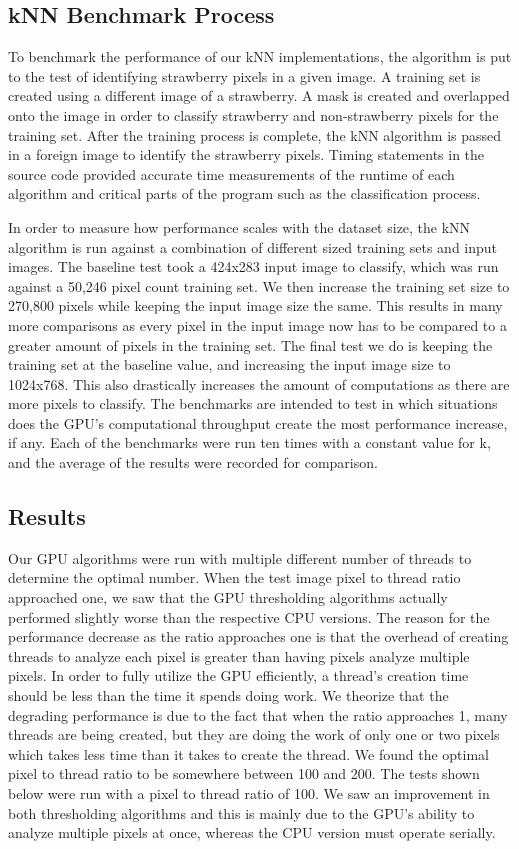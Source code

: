 \documentclass[conference]{IEEEtran}
\begin{document}
\subsection{kNN Benchmark Process}
To benchmark the performance of our kNN implementations, the algorithm is put to the test of identifying strawberry pixels in a given image. A training set is created using a different image of a strawberry. A mask is created and overlapped onto the image in order to classify strawberry and non-strawberry pixels for the training set. After the training process is complete, the kNN algorithm is passed in a foreign image to identify the strawberry pixels. Timing statements in the source code provided accurate time measurements of the runtime of each algorithm and critical parts of the program such as the classification process.

In order to measure how performance scales with the dataset size, the kNN algorithm is run against a combination of different sized training sets and input images. The baseline test took a 424x283 input image to classify, which was run against a 50,246 pixel count training set. We then increase the training set size to 270,800 pixels while keeping the input image size the same. This results in many more comparisons as every pixel in the input image now has to be compared to a greater amount of pixels in the training set. The final test we do is keeping the training set at the baseline value, and increasing the input image size to 1024x768. This also drastically increases the amount of computations as there are more pixels to classify. The benchmarks are intended to test in which situations does the GPU's computational throughput create the most performance increase, if any. Each of the benchmarks were run ten times with a constant value for k, and the average of the results were recorded for comparison.

\subsection{Results}

Our GPU algorithms were run with multiple different number of threads to determine the optimal number. When the test image pixel to thread ratio approached one, we saw that the GPU thresholding algorithms actually performed slightly worse than the respective CPU versions. The reason for the performance decrease as the ratio approaches one is that the overhead of creating threads to analyze each pixel is greater than having pixels analyze multiple pixels. In order to fully utilize the GPU efficiently, a thread’s creation time should be less than the time it spends doing work. We theorize that the degrading performance is due to the fact that when the ratio approaches 1, many threads are being created, but they are doing the work of only one or two pixels which takes less time than it takes to create the thread. We found the optimal pixel to thread ratio to be somewhere between 100 and 200. The tests shown below were run with a pixel to thread ratio of 100. We saw an improvement in both thresholding algorithms and this is mainly due to the GPU’s ability to analyze multiple pixels at once, whereas the CPU version must operate serially.
\end{document}

